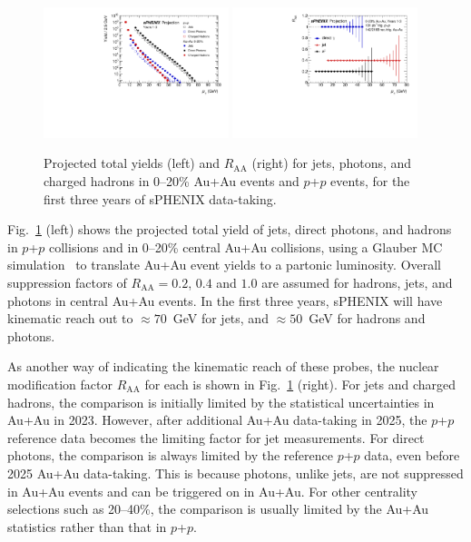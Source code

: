 \begin{figure}[h]
\centering
\includegraphics[width=0.48\textwidth]{figs/master_Years13_yields.pdf}
\includegraphics[width=0.48\textwidth]{figs/RAA_jet_1.pdf}
\caption{Projected total yields (left) and $R_\mathrm{AA}$ (right) for jets, photons, and charged hadrons in 0--20\% Au+Au events and $p$+$p$ events, for the first three years of sPHENIX data-taking.}
\label{fig:jet_RAA_proj}
\end{figure}

Fig.~\ref{fig:jet_RAA_proj} (left) shows the projected total yield of jets, direct photons, and hadrons in $p$+$p$ collisions and in 0--20\% central Au+Au collisions, using a Glauber MC simulation~\cite{Miller:2007ri} to translate Au+Au event yields to a partonic luminosity. Overall suppression factors of $R_\mathrm{AA} = 0.2$, $0.4$ and $1.0$ are assumed for hadrons, jets, and photons in central Au+Au events. In the first three years, sPHENIX will have kinematic reach out to $\approx 70$~GeV for jets, and $\approx50$~GeV for hadrons and photons.  

As another way of indicating the kinematic reach of these probes, the nuclear modification factor $R_\mathrm{AA}$ for each is shown in Fig.~\ref{fig:jet_RAA_proj} (right). For jets and charged hadrons, the comparison is initially limited by the statistical uncertainties in Au+Au in 2023. However, after additional Au+Au data-taking in 2025, the $p$+$p$ reference data becomes the limiting factor for jet measurements. For direct photons, the comparison is always limited by the reference $p$+$p$ data, even before 2025 Au+Au data-taking. This is because photons, unlike jets, are not suppressed in Au+Au events and can be triggered on in Au+Au. For other centrality selections such as 20--40\%, the comparison is usually limited by the Au+Au statistics rather than that in $p$+$p$.

